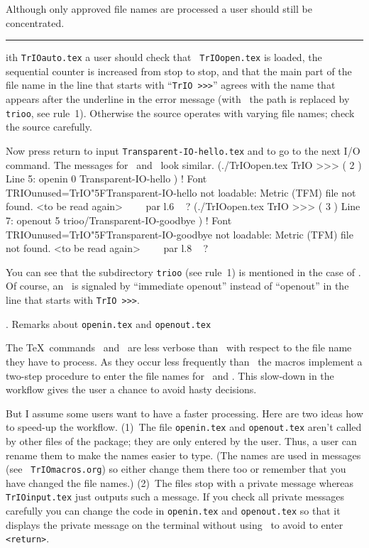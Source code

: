 Although only approved file names are processed a user should still be
concentrated.

 \rule{17} With {\tt TrIOauto.tex} a user should check that {\tt
TrIOopen.tex} is loaded, the sequential counter is increased from stop
to stop, and that the main part of the file name in the line that
starts with ``{\tt TrIO >>>}'' agrees with the name that appears after
the underline in the error message (with \cs\openout\ the path is
replaced by {\tt trioo}, see rule~1). Otherwise the source operates
with varying file names; check the source carefully.

Now press return to input {\tt Transparent-IO-hello.tex} and to go to the next I/O
command. The messages for \cs\openin\ and \cs\openout\ look similar.
\beginverbatim
(./TrIOopen.tex\parni
TrIO >>> ( 2 ) Line 5: openin 0 Transparent-IO-hello\parni
)\parni
! Font \bs TRIOunused=TrIO\char"5FTransparent-IO-hello not loadable: Metric (TFM) file not found.\parni
<to be read again> \parni
\tenspaces\fivespaces\ \ \ \ \bs par\parni
l.6 \parni
\ \parni
? \parni
(./TrIOopen.tex\parni
TrIO >>> ( 3 ) Line 7: openout 5 trioo/Transparent-IO-goodbye\parni
)\parni
! Font \bs TRIOunused=TrIO\char"5FTransparent-IO-goodbye not loadable: Metric (TFM) file not found.\parni
<to be read again> \parni
\tenspaces\fivespaces\ \ \ \ \bs par\parni
l.8 \parni
\ \parni
? \endverbatim

You can see that the subdirectory {\tt trioo} (see rule~1) is
mentioned in the case of \cs\openout. Of course,
an \cs\immediate\cs\openout\ is signaled by ``immediate openout''
instead of ``openout'' in the line that starts with {\tt TrIO >>>}.




. Remarks about {\tt openin.tex} and {\tt openout.tex}

The \TeX\ commands \cs\openin\ and \cs\openout\ are less verbose
than \cs\ with respect to the file name they have to process. As
they occur less frequently than \cs\ the macros implement a
two-step procedure to enter the file names for \cs\openin\
and \cs\openout. This slow-down in the workflow gives the user a
chance to avoid hasty decisions.

But I assume some users want to have a faster processing. Here are two
ideas how to speed-up the workflow. (1)~The file {\tt openin.tex} and
{\tt openout.tex} aren't called by other files of the package; they
are only entered by the user. Thus, a user can rename them to make the
names easier to type. (The names are used in messages (see {\tt
TrIOmacros.org}) so either change them there too or remember that you
have changed the file names.)  (2)~The files stop with a private
message whereas {\tt TrIOinput.tex} just outputs such a message. If
you check all private messages carefully you can change the code in
{\tt openin.tex} and {\tt openout.tex} so that it displays the private
message on the terminal without using \cs\pausing\ to avoid to enter
{\tt<return>}.\looseness=-1





